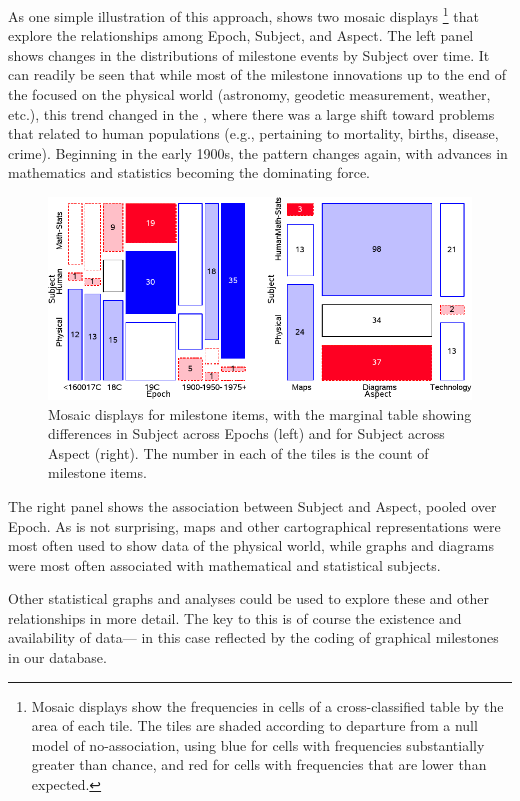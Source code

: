 As one simple illustration of this approach,  shows two mosaic displays%
\footnote{Mosaic displays show the frequencies in cells of a cross-classified table by the area of each tile.  
The tiles are shaded according to departure from a null
model of no-association, using blue for cells with frequencies substantially greater than chance, and red for cells 
with frequencies that are lower than expected.}
that explore the relationships among Epoch, Subject, and Aspect. 
The left panel shows changes in the distributions of milestone events by Subject over time.  
It can readily be seen that while most of the milestone innovations up to the end of the  focused on 
the physical world (astronomy, geodetic measurement, weather, etc.), 
this trend changed in the , where there was a large shift toward problems that related to human populations 
(e.g., pertaining to mortality, births, disease, crime). 
Beginning in the early 1900s, the pattern changes again, with advances in mathematics and statistics becoming the dominating force.

\begin{figure}[!htb]
  \centering
  \includegraphics[width=\textwidth,clip]{fig/milecats4}
  \caption{Mosaic displays for milestone items, with the marginal table showing differences in Subject across Epochs (left) and for Subject across Aspect (right). The number in each of the tiles is the count of milestone items.}
  \label{fig:milecats4}
\end{figure}

The right panel shows the association between Subject and Aspect, pooled over Epoch. 
As is not surprising, maps and other cartographical representations were most often used to show data of the physical world, 
while graphs and diagrams were most often associated with mathematical and statistical subjects.

Other statistical graphs and analyses could be used to explore these and other relationships in more detail. 
The key to this is of course the existence and availability of data--- in this case reflected by the coding of graphical milestones in our database.
